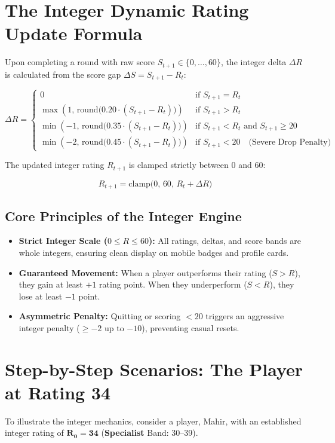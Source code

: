 \section{The Integer Dynamic Rating Update Formula}
Upon completing a round with raw score $S_{t+1} \in \{0, \dots, 60\}$, the integer delta $\Delta R$ is calculated from the score gap $\Delta S = S_{t+1} - R_t$:

\begin{equation}
\Delta R = 
\begin{cases} 
0 & \text{if } S_{t+1} = R_t \\
\max\left(1, \, \text{round}\big(0.20 \cdot (S_{t+1} - R_t)\big)\right) & \text{if } S_{t+1} > R_t \\
\min\left(-1, \, \text{round}\big(0.35 \cdot (S_{t+1} - R_t)\big)\right) & \text{if } S_{t+1} < R_t \text{ and } S_{t+1} \ge 20 \\
\min\left(-2, \, \text{round}\big(0.45 \cdot (S_{t+1} - R_t)\big)\right) & \text{if } S_{t+1} < 20 \quad \text{(Severe Drop Penalty)}
\end{cases}
\end{equation}

The updated integer rating $R_{t+1}$ is clamped strictly between 0 and 60:

\begin{equation}
R_{t+1} = \text{clamp}\big(0, \, 60, \, R_t + \Delta R\big)
\end{equation}

\subsection{Core Principles of the Integer Engine}
\begin{itemize}
    \item \textbf{Strict Integer Scale ($0 \le R \le 60$):} All ratings, deltas, and score bands are whole integers, ensuring clean display on mobile badges and profile cards.
    \item \textbf{Guaranteed Movement:} When a player outperforms their rating ($S > R$), they gain at least $+1$ rating point. When they underperform ($S < R$), they lose at least $-1$ point.
    \item \textbf{Asymmetric Penalty:} Quitting or scoring $<20$ triggers an aggressive integer penalty ($\ge -2$ up to $-10$), preventing casual resets.
\end{itemize}

\section{Step-by-Step Scenarios: The Player at Rating 34}
To illustrate the integer mechanics, consider a player, Mahir, with an established integer rating of $\mathbf{R_0 = 34}$ (\textbf{Specialist} Band: 30--39).

